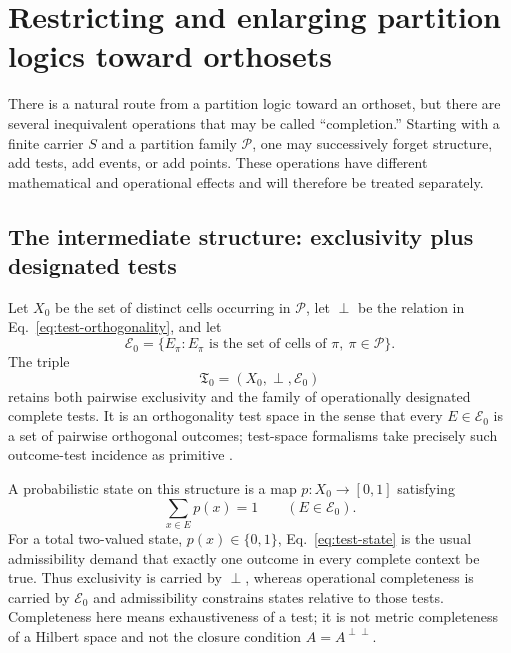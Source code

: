 \documentclass[
  aps,
  pra,
  twocolumn,
  amsmath,
  amssymb,
  longbibliography,
  nofootinbib,
  floatfix
]{revtex4-2}
\newcommand{\cP}{\mathcal P}
\newcommand{\cE}{\mathcal E}
\begin{document}
\section{Restricting and enlarging partition logics toward orthosets}
\label{sec:enlargement}

There is a natural route from a partition logic toward an orthoset, but there
are several inequivalent operations that may be called ``completion.''  Starting
with a finite carrier $S$ and a partition family $\cP$, one may successively
forget structure, add tests, add events, or add points.  These operations have
different mathematical and operational effects and will therefore be treated
separately.

\subsection{The intermediate structure: exclusivity plus designated tests}

Let $X_0$ be the set of distinct cells occurring in $\cP$, let $\perp$ be the
relation in Eq.~\eqref{eq:test-orthogonality}, and let
\begin{equation}
  \cE_0=\{E_\pi:E_\pi\text{ is the set of cells of }\pi,
                    \ \pi\in\cP\}.
  \label{eq:designated-tests}
\end{equation}
The triple
\begin{equation}
  \mathfrak T_0=(X_0,\perp,\cE_0)
  \label{eq:test-orthoset}
\end{equation}
retains both pairwise exclusivity and the family of operationally designated
complete tests.  It is an orthogonality test space in the sense that every
$E\in\cE_0$ is a set of pairwise orthogonal outcomes; test-space formalisms
take precisely such outcome-test incidence as primitive
\cite{Foulis-Randall,Wilce2009TestSpaces,
acin-fritz-leverrier-sainz-2015}.

A probabilistic state on this structure is a map $p:X_0\to[0,1]$ satisfying
\begin{equation}
  \sum_{x\in E}p(x)=1\qquad(E\in\cE_0).
  \label{eq:test-state}
\end{equation}
For a total two-valued state, $p(x)\in\{0,1\}$, Eq.~\eqref{eq:test-state} is the
usual admissibility demand that exactly one outcome in every complete context
be true.  Thus exclusivity is carried by $\perp$, whereas operational
completeness is carried by $\cE_0$ and admissibility constrains states relative
to those tests.  Completeness here means exhaustiveness of a test; it is not
metric completeness of a Hilbert space and not the closure condition
$A=A^{\perp\perp}$.
\end{document}
